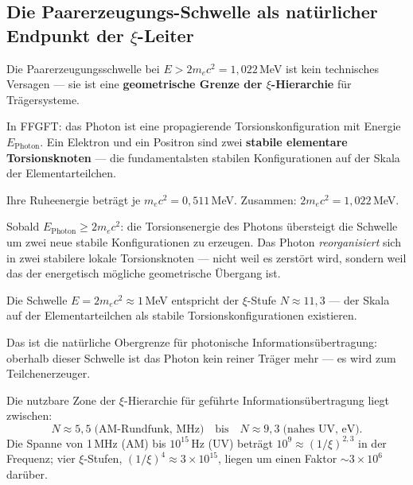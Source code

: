 \subsection{Die Paarerzeugungs-Schwelle als natürlicher
  Endpunkt der \texorpdfstring{$\xi$}{xi}-Leiter}
\label{sec:paarerschoepfung}

Die Paarerzeugungsschwelle bei $E > 2 m_e c^2 = 1{,}022$\,MeV
ist kein technisches Versagen ---
sie ist eine \textbf{geometrische Grenze der $\xi$-Hierarchie}
für Trägersysteme.

In FFGFT: das Photon ist eine propagierende
Torsionskonfiguration mit Energie $E_\text{Photon}$.
Ein Elektron und ein Positron sind zwei
\textbf{stabile elementare Torsionsknoten} ---
die fundamentalsten stabilen Konfigurationen
auf der Skala der Elementarteilchen.

Ihre Ruheenergie beträgt je $m_e c^2 = 0{,}511$\,MeV.
Zusammen: $2 m_e c^2 = 1{,}022$\,MeV.

Sobald $E_\text{Photon} \geq 2 m_e c^2$:
die Torsionsenergie des Photons übersteigt
die Schwelle um zwei neue stabile Konfigurationen
zu erzeugen.
Das Photon \emph{reorganisiert} sich in
zwei stabilere lokale Torsionsknoten ---
nicht weil es zerstört wird,
sondern weil das der energetisch mögliche
geometrische Übergang ist.

\begin{keyresult}
Die Schwelle $E = 2 m_e c^2 \approx 1$\,MeV
entspricht der $\xi$-Stufe $N \approx 11{,}3$ ---
der Skala auf der Elementarteilchen als stabile
Torsionskonfigurationen existieren.

Das ist die natürliche Obergrenze für photonische
Informationsübertragung:
oberhalb dieser Schwelle ist das Photon kein
reiner Träger mehr --- es wird zum
Teilchenerzeuger.

Die nutzbare Zone der $\xi$-Hierarchie für
geführte Informationsübertragung liegt zwischen:
\begin{equation}
  N \approx 5{,}5 \;\text{(AM-Rundfunk, MHz)}
  \quad\text{bis}\quad
  N \approx 9{,}3 \;\text{(nahes UV, eV)}.
\end{equation}
Die Spanne von 1\,MHz (AM) bis $10^{15}$\,Hz (UV) beträgt
$10^9 \approx (1/\xi)^{2{,}3}$ in der Frequenz; vier $\xi$-Stufen,
$(1/\xi)^4 \approx 3 \times 10^{15}$, liegen um einen Faktor
$\sim 3\times10^6$ darüber.
\end{keyresult}

